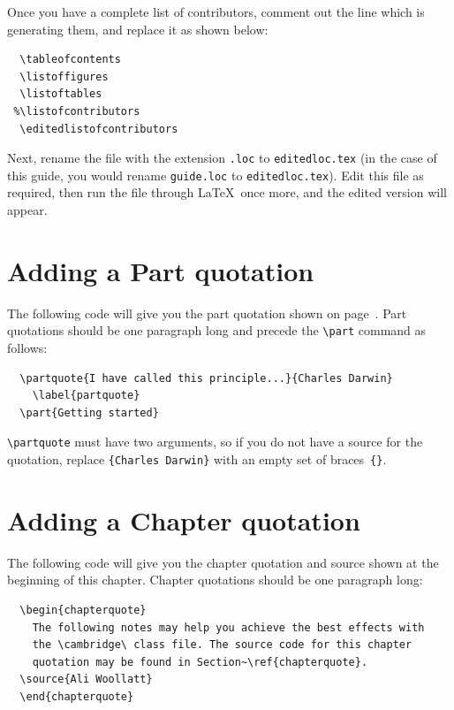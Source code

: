 Once you have a complete list of contributors, comment out the line which is generating them, and replace it as shown below:
\begin{verbatim}
  \tableofcontents
  \listoffigures
  \listoftables
 %\listofcontributors
  \editedlistofcontributors
\end{verbatim}
Next, rename the file with the extension \verb".loc" to \verb"editedloc.tex" (in the case of this guide, you would rename \texttt{\cambridge guide.loc} to \verb"editedloc.tex"). Edit this file as required, then run the file through \LaTeX\ once more, and the edited version will appear.


\section{Adding a Part quotation}
\label{partquotation}
The following code will give you the part quotation shown on page~\pageref{partquote}. Part quotations should be one paragraph long and precede the \verb"\part" command as follows:
\begin{verbatim}
  \partquote{I have called this principle...}{Charles Darwin}
    \label{partquote}
  \part{Getting started}
\end{verbatim}
\verb"\partquote" must have two arguments, so if you do not have a source for the quotation, replace \verb"{Charles Darwin}" with an empty set of braces~\verb"{}".


\section{Adding a Chapter quotation}\label{chapterquote}
The following code will give you the chapter quotation and source shown at the beginning of this chapter. Chapter quotations should be one paragraph long:
\begin{verbatim}
  \begin{chapterquote}
    The following notes may help you achieve the best effects with
    the \cambridge\ class file. The source code for this chapter
    quotation may be found in Section~\ref{chapterquote}.
  \source{Ali Woollatt}
  \end{chapterquote}
\end{verbatim}


